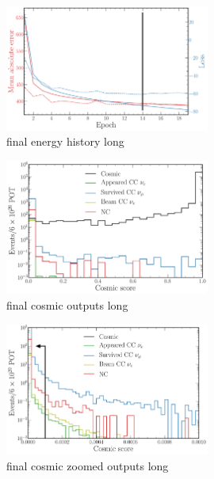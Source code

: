 \begin{figure} %
    \includegraphics[width=0.6\textwidth]{diagrams/6-cvn/chipsnet/final_energy_history.pdf}
    \caption[final energy history short]
    {final energy history long}
    \label{fig:final_energy_history}
\end{figure}

\begin{figure} %
    \includegraphics[width=0.6\textwidth]{diagrams/6-cvn/chipsnet/final_cosmic_outputs.pdf}
    \caption[final cosmic outputs short]
    {final cosmic outputs long}
    \label{fig:final_cosmic_outputs}
\end{figure}

\begin{figure} %
    \includegraphics[width=0.6\textwidth]{diagrams/6-cvn/chipsnet/final_cosmic_zoomed_outputs.pdf}
    \caption[final cosmic zoomed outputs short]
    {final cosmic zoomed outputs long}
    \label{fig:final_cosmic_zoomed_outputs}
\end{figure}

